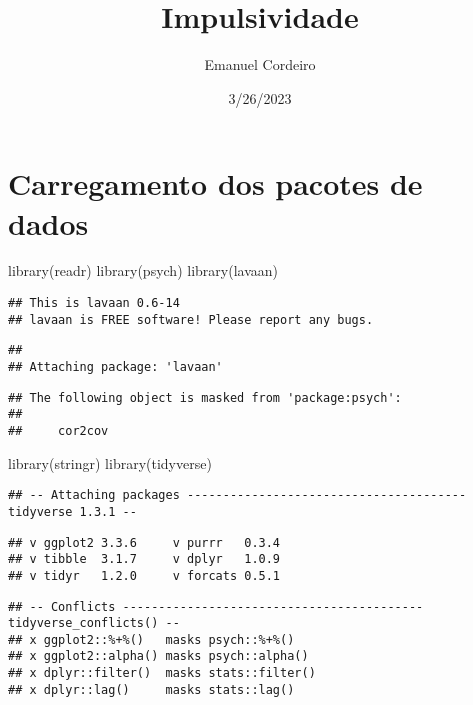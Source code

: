 \documentclass[
]{article}
\title{Impulsividade}
\author{Emanuel Cordeiro}
\date{3/26/2023}
\newenvironment{Shaded}{\begin{snugshade}}{\end{snugshade}}
\newcommand{\FunctionTok}[1]{\textcolor[rgb]{0.00,0.00,0.00}{#1}}
\newcommand{\NormalTok}[1]{#1}
\begin{document}
\maketitle

\hypertarget{carregamento-dos-pacotes-de-dados}{%
\section{Carregamento dos pacotes de
dados}\label{carregamento-dos-pacotes-de-dados}}

\begin{Shaded}
\begin{Highlighting}[]
\FunctionTok{library}\NormalTok{(readr)}
\FunctionTok{library}\NormalTok{(psych)}
\FunctionTok{library}\NormalTok{(lavaan)}
\end{Highlighting}
\end{Shaded}

\begin{verbatim}
## This is lavaan 0.6-14
## lavaan is FREE software! Please report any bugs.
\end{verbatim}

\begin{verbatim}
## 
## Attaching package: 'lavaan'
\end{verbatim}

\begin{verbatim}
## The following object is masked from 'package:psych':
## 
##     cor2cov
\end{verbatim}

\begin{Shaded}
\begin{Highlighting}[]
\FunctionTok{library}\NormalTok{(stringr)}
\FunctionTok{library}\NormalTok{(tidyverse)}
\end{Highlighting}
\end{Shaded}

\begin{verbatim}
## -- Attaching packages --------------------------------------- tidyverse 1.3.1 --
\end{verbatim}

\begin{verbatim}
## v ggplot2 3.3.6     v purrr   0.3.4
## v tibble  3.1.7     v dplyr   1.0.9
## v tidyr   1.2.0     v forcats 0.5.1
\end{verbatim}

\begin{verbatim}
## -- Conflicts ------------------------------------------ tidyverse_conflicts() --
## x ggplot2::%+%()   masks psych::%+%()
## x ggplot2::alpha() masks psych::alpha()
## x dplyr::filter()  masks stats::filter()
## x dplyr::lag()     masks stats::lag()
\end{verbatim}
\end{document}
